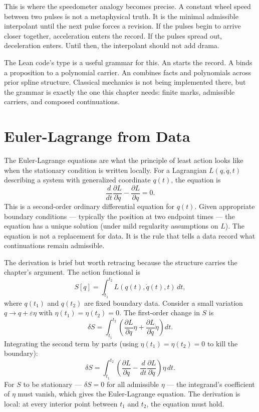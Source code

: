 This is where the speedometer analogy becomes precise. A constant wheel speed
between two pulses is not a metaphysical truth. It is the minimal admissible
interpolant until the next pulse forces a revision. If the pulses begin to
arrive closer together, acceleration enters the record. If the pulses spread
out, deceleration enters. Until then, the interpolant should not add drama.

The Lean code's  type is a useful grammar for this. An
 starts the record. A  binds a proposition to a
polynomial carrier. An  combines facts and polynomials across
prior spline structure. Classical mechanics is not being implemented there, but
the grammar is exactly the one this chapter needs: finite marks, admissible
carriers, and composed continuations.

\section{Euler-Lagrange from Data}
\label{se:euler-lagrange-from-data}

The Euler-Lagrange equations are what the principle of least action looks like
when the stationary condition is written locally. For a Lagrangian $L(q,
\dot{q}, t)$ describing a system with generalized coordinate $q(t)$, the
equation is
\[
\frac{d}{dt}\frac{\partial L}{\partial \dot q}
  - \frac{\partial L}{\partial q} = 0.
\label{eq:chapter6-euler-lagrange}
\]
This is a second-order ordinary differential equation for $q(t)$. Given
appropriate boundary conditions --- typically the position at two endpoint
times --- the equation has a unique solution (under mild regularity
assumptions on $L$). The equation is not a replacement for data. It is the
rule that tells a data record what continuations remain admissible.

The derivation is brief but worth retracing because the structure carries
the chapter's argument. The action functional is
\[
S[q] = \int_{t_1}^{t_2} L(q(t), \dot{q}(t), t) \, dt,
\]
where $q(t_1)$ and $q(t_2)$ are fixed boundary data. Consider a small
variation $q \to q + \varepsilon \eta$ with $\eta(t_1) = \eta(t_2) = 0$.
The first-order change in $S$ is
\[
\delta S = \int_{t_1}^{t_2}\left(\frac{\partial L}{\partial q} \eta + \frac{\partial L}{\partial \dot{q}} \dot{\eta}\right) dt.
\]
Integrating the second term by parts (using $\eta(t_1) = \eta(t_2) = 0$ to
kill the boundary):
\[
\delta S = \int_{t_1}^{t_2}\left(\frac{\partial L}{\partial q} - \frac{d}{dt}\frac{\partial L}{\partial \dot{q}}\right) \eta \, dt.
\]
For $S$ to be stationary --- $\delta S = 0$ for all admissible $\eta$ --- the
integrand's coefficient of $\eta$ must vanish, which gives the
Euler-Lagrange equation. The derivation is local: at every interior point
between $t_1$ and $t_2$, the equation must hold.

